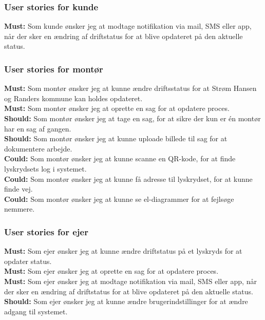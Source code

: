 \subsubsection{User stories for kunde}
\textbf{Must:} Som kunde ønsker jeg at modtage notifikation via mail, SMS eller app, når der sker en ændring af driftstatus for at blive opdateret på den aktuelle status.

\subsubsection{User stories for montør}
\textbf{Must:} Som montør ønsker jeg at kunne ændre driftsstatus for at Strøm Hansen og Randers kommune kan holdes opdateret.\\
\textbf{Must:} Som montør ønsker jeg at oprette en sag for at opdatere proces.\\	
\textbf{Should:} Som montør ønsker jeg at tage en sag, for at sikre der kun er én montør har en sag af gangen.\\
\textbf{Should:} Som montør ønsker jeg at kunne uploade billede til sag for at dokumentere arbejde.\\
\textbf{Could:} Som montør ønsker jeg at kunne scanne en QR-kode, for at finde lyskrydsets log i systemet.\\
\textbf{Could:} Som montør ønsker jeg at kunne få adresse til lyskrydset, for at kunne finde vej.\\
\textbf{Could:} Som montør ønsker jeg at kunne se el-diagrammer for at fejlsøge nemmere.

\subsubsection{User stories for ejer}
\textbf{Must:} Som ejer ønsker jeg at kunne ændre driftstatus på et lyskryds for at opdater status.\\
\textbf{Must:} Som ejer ønsker jeg at oprette en sag for at opdatere proces.\\
\textbf{Must:} Som ejer ønsker jeg at modtage notifikation via mail, SMS eller app, når der sker en ændring af driftstatus for at blive opdateret på den aktuelle status.\\
\textbf{Should:} Som ejer ønsker jeg at kunne ændre brugerindstillinger for at ændre adgang til systemet.

\hspace{1em}
